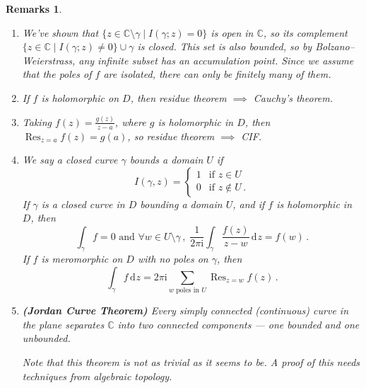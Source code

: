 \documentclass{article}
\theoremstyle{plain}\theoremheaderfont{\normalfont\itshape}\theorembodyfont{\rmfamily}\theoremseparator{.}\newtheorem*{rem}{Remark}\newtheorem*{ex}{Example}\newtheorem*{proof}{Proof}\newtheorem*{altp}{Alternative proof}\newtheorem*{con}{Consequences}\newtheorem*{notn}{Notations}\newtheorem*{cau}{Caution}\newtheorem*{term}{Terminology}\newtheorem*{keyex}{Key example}
\theoremstyle{plain}\theoremheaderfont{\normalfont\bfseries}\theorembodyfont{\rmfamily}\theoremseparator{.}\newtheorem{thm}{Theorem}[section]\newtheorem{lem}[thm]{Lemma}\newtheorem{prop}[thm]{Proposition}\newtheorem*{cor}{Corollary}\newtheorem{defn}[thm]{Definition}\newtheorem{clm}[thm]{Claim}\newtheorem{clminproof}{Claim}\newtheorem{leminproof}{Lemma}\newtheorem{app}{Application}
\theoremstyle{break}\theoremheaderfont{\normalfont\itshape}\theorembodyfont{\rmfamily}\theoremseparator{.\medskip}\newtheorem*{proofskip}{Proof}\newtheorem*{exs}{Examples}\newtheorem*{rems}{Remarks}\newtheorem*{rec}{Recall}\newtheorem*{ppts}{Properties}
\theoremstyle{break}\theoremheaderfont{\normalfont\bfseries}\theorembodyfont{\rmfamily}\theoremseparator{.\medskip}\newtheorem{lemskip}[thm]{Lemma}\newtheorem{defnskip}[thm]{Definition}\newtheorem{propskip}[thm]{Proposition}\newtheorem{thmskip}[thm]{Theorem}
\numberwithin{equation}{section}
\newcommand{\ii}{\mathrm{i}}
\DeclareMathOperator*{\Res}{Res}
\newcommand{\dd}[2][]{\,\mathrm{d}^{#1} #2}
\newcommand{\CC}{\mathbb{C}}
\begin{document}
    \begin{rems}
        \begin{enumerate}[topsep=0pt,label=(\roman*)]
            \item We've shown that \(\{z\in\CC\setminus\gamma\mid I(\gamma;z)=0\}\) is open in \(\CC\), so its complement \(\{z\in\CC\mid I(\gamma;z)\ne0\}\cup\gamma\) is closed. This set is also bounded, so by Bolzano--Weierstrass, any infinite subset has an accumulation point. Since we assume that the poles of \(f\) are isolated, there can only be finitely many of them.
            \item If \(f\) is holomorphic on \(D\), then residue theorem \(\implies\) Cauchy's theorem.
            \item Taking \(f(z)=\frac{g(z)}{z-a}\), where \(g\) is holomorphic in \(D\), then \(\Res_{z=a}f(z)=g(a)\), so residue theorem \(\implies\) CIF.
            \item We say a closed curve \(\gamma\) \textit{bounds} a domain \(U\) if
            \[I(\gamma,z)=\begin{cases}
                1 & \text{if }z\in U\\
                0 & \text{if }z\notin U\,.
            \end{cases}\]
            If \(\gamma\) is a closed curve in \(D\) bounding a domain \(U\), and if \(f\) is holomorphic in \(D\), then
            \[\int_{\gamma}f=0\text{ and }\forall w\in U\setminus\gamma\,,\; \frac{1}{2\pi \ii}\int_\gamma\frac{f(z)}{z-w}\dd{z}=f(w)\,.\]
            If \(f\) is meromorphic on \(D\) with no poles on \(\gamma\), then
            \[\int_\gamma f\dd{z}=2\pi \ii\sum_{w\text{ poles in }U}\Res_{z=w}f(z)\,.\]
            \item\textbf{(Jordan Curve Theorem)} Every simply connected (continuous) curve in the plane separates \(\CC\) into two connected components --- one bounded and one unbounded.
            
            Note that this theorem is not as trivial as it seems to be. A proof of this needs techniques from algebraic topology.
        \end{enumerate}
    \end{rems}
\end{document}
